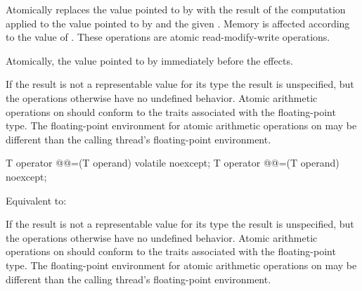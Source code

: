 \begin{itemdescr}
\pnum
\effects
Atomically replaces the value pointed to by 
with the result of the computation applied to the value pointed
to by  and the given .
Memory is affected according to the value of .
These operations are atomic read-modify-write operations.

\pnum
\returns
Atomically, the value pointed to by  immediately before the effects.

\pnum
\remarks
If the result is not a representable value for its type
the result is unspecified, but the operations otherwise have no undefined
behavior. Atomic arithmetic operations on 
should conform to the 
traits associated with the floating-point type.
The floating-point environment for atomic arithmetic operations
on  may be different than the
calling thread's floating-point environment.
\end{itemdescr}

%
%
%
%
\begin{itemdecl}
T operator @@=(T operand) volatile noexcept;
T operator @@=(T operand) noexcept;
\end{itemdecl}

\begin{itemdescr}
\pnum
\effects
Equivalent to: 

\pnum
\remarks
If the result is not a representable value for its type
the result is unspecified, but the operations otherwise have no undefined
behavior. Atomic arithmetic operations on 
should conform to the 
traits associated with the floating-point type.
The floating-point environment for atomic arithmetic operations
on  may be different than the
calling thread's floating-point environment.
\end{itemdescr}

